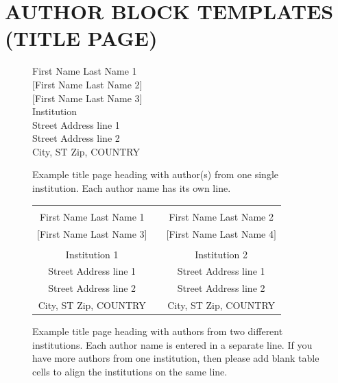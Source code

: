 \documentclass{wscpaperproc}
\theoremstyle{wsc}
\begin{document}
\newpage

\section*{AUTHOR BLOCK TEMPLATES (TITLE PAGE)}

\begin{figure}[htb]
{
\centering
First Name Last Name 1 \\
$[$First Name Last Name 2$]$ \\
$[$First Name Last Name 3$]$ \\
\vspace{12pt}
Institution \\
Street Address line 1 \\
Street Address line 2 \\
City, ST Zip, COUNTRY
\caption{Example title page heading with author(s) from one single institution. Each author name has its own line. \label{fig: 2 same}}
}
\end{figure}

\begin{figure}[htb]
{
\centering
\begin{tabular}{ccc}
\phantom{Entries to adjust spacing - ignore} & \phantom{intermediate space} & \phantom{Entries to adjust spacing - ignore} \\
First Name Last Name 1 & & First Name Last Name 2 \\
$[$First Name Last Name 3$]$ & & $[$First Name Last Name 4$]$ \\
\\
Institution 1 & & Institution 2 \\
Street Address line 1 & & Street Address line 1 \\
Street Address line 2 & & Street Address line 2 \\
City, ST Zip, COUNTRY & & City, ST Zip, COUNTRY
\end{tabular}
\caption{Example title page heading with authors from two different institutions. Each author name is entered in a separate line. If you have more authors from one institution, then please add blank table cells to align the institutions on the same line. \label{fig: 2 different}}
}
\end{figure}
\end{document}

